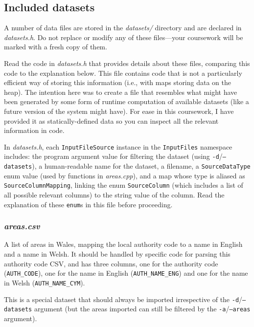 \documentclass[a4paper]{article}
\begin{document}
\subsection*{Included datasets}\label{sec:cwk datasets}

A number of data files are stored in the \emph{datasets/} directory and are declared in \emph{datasets.h}. Do not replace or modify any of these files---your coursework will be marked with a fresh copy of them. 

Read the code in \emph{datasets.h} that provides details about these files, comparing this code to the explanation below. This file contains code that is not a particularly efficient way of storing this information (i.e., with maps storing data on the heap). The intention here was to create a file that resembles what might have been generated by some form of runtime computation of available datasets (like a future version of the system might have). For ease in this coursework, I have provided it as statically-defined data so you can inspect all the relevant information in code.

In \emph{datasets.h}, each \texttt{InputFileSource} instance in the \texttt{InputFiles} namespace includes: the program argument value for filtering the dataset (using \texttt{-d}/\texttt{--datasets}), a human-readable name for the dataset, a filename, a \texttt{SourceDataType} enum value (used by functions in \emph{areas.cpp}), and a map whose type is aliased as \texttt{SourceColumnMapping}, linking the enum \texttt{SourceColumn} (which includes a list of all possible relevant columns) to the string value of the column. Read the explanation of these \texttt{enum}s in this file before proceeding.

\subsubsection*{\emph{areas.csv}}\label{sec:cwk datasets areas}
A list of areas in Wales, mapping the local authority code to a name in English and a name in Welsh. It should be handled by specific code for parsing this authority code CSV, and has three columns, one for the authority code (\texttt{AUTH\_CODE}), one for the name in English (\texttt{AUTH\_NAME\_ENG}) and one for the name in Welsh (\texttt{AUTH\_NAME\_CYM}).

This is a special dataset that should always be imported irrespective of the \texttt{-d}/\texttt{--datasets} argument (but the areas imported can still be filtered by the \texttt{-a}/\texttt{--areas} argument).
\end{document}
